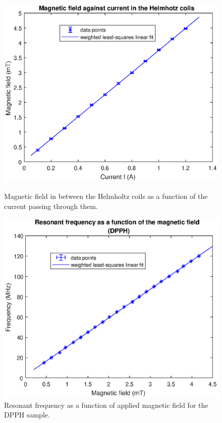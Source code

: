 \documentclass[a4paper]{jpconf}
\numberwithin{equation}{section}
\begin{document}
\begin{figure}[htbp]
	\begin{minipage}[b]{2.9in}
		\includegraphics[scale=0.59]{ESR_calibration.eps}
		\caption{Magnetic field in between the Helmholtz coils as a function of the current passing through them.}
		\label{fig: HC calibration curve}
	\end{minipage}
    \hspace{1.5pc}
	\begin{minipage}[b]{3in}
		\includegraphics[scale=0.6]{DPPH.eps}
		\caption{Resonant frequency as a function of applied magnetic field for the DPPH sample.}
		\label{fig: DPPH resonance}
	\end{minipage}
\end{figure}
\end{document}
